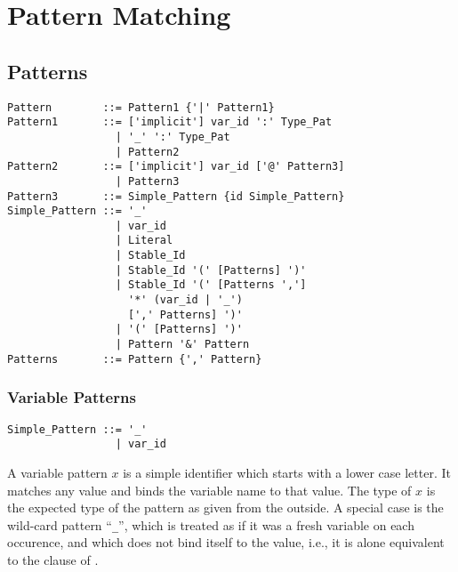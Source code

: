 
\chapter{Pattern Matching}
\label{sec:pattern-matching}






\section{Patterns}
\label{sec:patterns}

\syntax\begin{lstlisting}
Pattern        ::= Pattern1 {'|' Pattern1}
Pattern1       ::= ['implicit'] var_id ':' Type_Pat
                 | '_' ':' Type_Pat
                 | Pattern2
Pattern2       ::= ['implicit'] var_id ['@' Pattern3]
                 | Pattern3
Pattern3       ::= Simple_Pattern {id Simple_Pattern}
Simple_Pattern ::= '_'
                 | var_id
                 | Literal
                 | Stable_Id
                 | Stable_Id '(' [Patterns] ')' 
                 | Stable_Id '(' [Patterns ','] 
                   '*' (var_id | '_')
                   [',' Patterns] ')'
                 | '(' [Patterns] ')'
                 | Pattern '&' Pattern
Patterns       ::= Pattern {',' Pattern}
\end{lstlisting}






\subsection{Variable Patterns}
\label{sec:variable-patterns}

\syntax\begin{lstlisting}
Simple_Pattern ::= '_'
                 | var_id
\end{lstlisting}

A variable pattern $x$ is a simple identifier which starts with a lower case letter. It matches any value and binds the variable name to that value. The type of $x$ is the expected type of the pattern as given from the outside. A special case is the wild-card pattern ``\lstinline!_!'', which is treated as if it was a fresh variable on each occurence, and which does not bind itself to the value, i.e., it is alone equivalent to the  clause of . 






